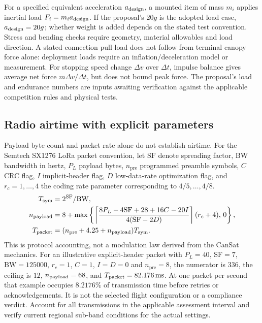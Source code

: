 \documentclass[11pt,a4paper]{article}
\numberwithin{equation}{section}
\begin{document}
For a specified equivalent acceleration $a_{\rm design}$, a mounted item
of mass $m_i$ applies inertial load $F_i=m_i a_{\rm design}$. If the
proposal's $20g$ is the adopted load case, $a_{\rm design}=20g$; whether
weight is added depends on the stated test convention. Stress and bending
checks require geometry, material allowables and load direction. A stated
connection pull load does not follow from terminal canopy force alone:
deployment loads require an inflation/deceleration model or measurement.
For stopping speed change $\Delta v$ over $\Delta t$, impulse balance
gives average net force $m\Delta v/\Delta t$, but does not bound peak force.
The proposal's load and endurance numbers are inputs awaiting verification
against the applicable competition rules and physical tests.

\subsection{Radio airtime with explicit parameters}

Payload byte count and packet rate alone do not establish airtime. For
the Semtech SX1276 LoRa packet convention, let $\mathrm{SF}$ denote
spreading factor, $\mathrm{BW}$ bandwidth in hertz, $P_L$ payload bytes,
$n_{\mathrm{pre}}$ programmed preamble symbols, $C$ CRC flag, $I$ implicit-header
flag, $D$ low-data-rate optimization flag, and $r_c=1,\ldots,4$ the coding
rate parameter corresponding to $4/5,\ldots,4/8$.
\begin{align}
 T_{\rm sym}&=2^{\mathrm{SF}}/\mathrm{BW},\\
 n_{\rm payload}&=8+\max\left\{
 \left\lceil\frac{8P_L-4\mathrm{SF}+28+16C-20I}
 {4(\mathrm{SF}-2D)}\right\rceil(r_c+4),\,0\right\},\\
 T_{\rm packet}&=(n_{\mathrm{pre}}+4.25+n_{\rm payload})T_{\rm sym}.
\end{align}
This is protocol accounting, not a modulation law derived from the CanSat
mechanics. For an illustrative explicit-header packet with $P_L=40$,
$\mathrm{SF}=7$, $\mathrm{BW}=125000$, $r_c=1$, $C=1$, $I=D=0$ and
$n_{\mathrm{pre}}=8$, the numerator is $336$, the ceiling is $12$,
$n_{\rm payload}=68$, and $T_{\rm packet}=82.176\,\mathrm{ms}$.
At one packet per second that example occupies $8.2176\%$ of transmission
time before retries or acknowledgements. It is not the selected flight
configuration or a compliance verdict. Account for all transmissions in
the applicable assessment interval and verify current regional sub-band
conditions for the actual settings.
\end{document}
